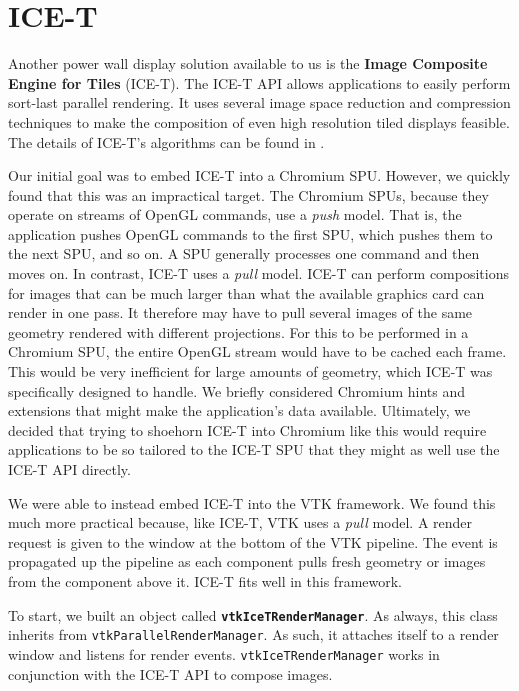 \documentclass{acmsiggraph}
\newcommand{\cidentifier}[1]{\texttt{#1}}
\newcommand{\keyterm}[1]{\textbf{#1}}
\begin{document}
  \section{ICE-T}
  \label{sec:ICE-T}

  Another power wall display solution available to us is the \keyterm{Image
  Composite Engine for Tiles} (ICE-T).  The ICE-T API allows applications
  to easily perform sort-last parallel rendering.  It uses several image
  space reduction and compression techniques to make the composition of
  even high resolution tiled displays feasible.  The details of ICE-T's
  algorithms can be found in \cite{Moreland01}.

  Our initial goal was to embed ICE-T into a Chromium SPU.  However, we
  quickly found that this was an impractical target.  The Chromium SPUs,
  because they operate on streams of OpenGL commands, use a \emph{push}
  model.  That is, the application pushes OpenGL commands to the first SPU,
  which pushes them to the next SPU, and so on.  A SPU generally processes
  one command and then moves on.  In contrast, ICE-T uses a \emph{pull}
  model.  ICE-T can perform compositions for images that can be much larger
  than what the available graphics card can render in one pass.  It
  therefore may have to pull several images of the same geometry rendered
  with different projections.  For this to be performed in a Chromium SPU,
  the entire OpenGL stream would have to be cached each frame.  This would
  be very inefficient for large amounts of geometry, which ICE-T was
  specifically designed to handle.  We briefly considered Chromium hints
  and extensions that might make the application's data available.
  Ultimately, we decided that trying to shoehorn ICE-T into Chromium like
  this would require applications to be so tailored to the ICE-T SPU that
  they might as well use the ICE-T API directly.

  We were able to instead embed ICE-T into the VTK framework.  We found
  this much more practical because, like ICE-T, VTK uses a \emph{pull}
  model.  A render request is given to the window at the bottom of the VTK
  pipeline.  The event is propagated up the pipeline as each component
  pulls fresh geometry or images from the component above it.  ICE-T fits
  well in this framework.

  To start, we built an object called
  \keyterm{\cidentifier{vtk\-Ice\-T\-Render\-Manager}}.  As always, this
  class inherits from \cidentifier{vtk\-Parallel\-Render\-Manager}.  As
  such, it attaches itself to a render window and listens for render
  events.  \cidentifier{vtk\-Ice\-T\-Render\-Manager} works in conjunction
  with the ICE-T API to compose images.
\end{document}
